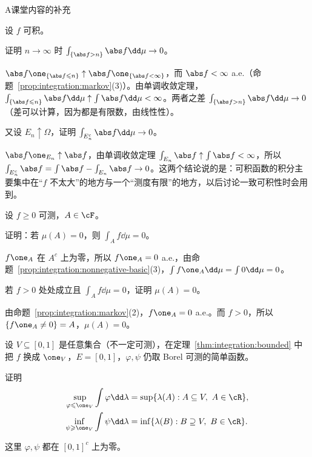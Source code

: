 \begin{exercises}{A}{课堂内容的补充}
\item\label{ex:integration:A6} 设 $f$ 可积。
\begin{questions}
\item 证明 $n\to\infty$ 时 $\int_{\{\abs f>n\}}\abs f\dd\mu\to0$。
\begin{solution}
$\abs f\one_{\{\abs f\leqslant n\}}\uparrow\abs f\one_{\{\abs f<\infty\}}$，而 $\abs f<\infty$ a.e.（命题~\ref{prop:integration:markov}(3)）。由单调收敛定理，$\int_{\{\abs f\leqslant n\}}\abs f\dd\mu\uparrow\int\abs f\dd\mu<\infty$。两者之差 $\int_{\{\abs f>n\}}\abs f\dd\mu\to0$（差可以计算，因为都是有限数，由线性性）。
\end{solution}
\item 又设 $E_n\uparrow\Omega$，证明 $\int_{E_n^c}\abs f\dd\mu\to0$。
\begin{solution}
$\abs f\one_{E_n}\uparrow\abs f$，由单调收敛定理 $\int_{E_n}\abs f\uparrow\int\abs f<\infty$，所以 $\int_{E_n^c}\abs f=\int\abs f-\int_{E_n}\abs f\to0$。这两个结论说的是：可积函数的积分主要集中在“$f$ 不太大”的地方与一个“测度有限”的地方，以后讨论一致可积性时会用到。
\end{solution}
\end{questions}

\item\label{ex:integration:A7} 设 $f\geqslant0$ 可测，$A\in\cF$。
\begin{questions}
\item 证明：若 $\mu(A)=0$，则 $\int_Af\dd\mu=0$。
\begin{solution}
$f\one_A$ 在 $A^c$ 上为零，所以 $f\one_A=0$ a.e.，由命题~\ref{prop:integration:nonnegative-basic}(3)，$\int f\one_A\dd\mu=\int0\dd\mu=0$。
\end{solution}
\item 若 $f>0$ 处处成立且 $\int_Af\dd\mu=0$，证明 $\mu(A)=0$。
\begin{solution}
由命题~\ref{prop:integration:markov}(2)，$f\one_A=0$ a.e.。而 $f>0$，所以 $\{f\one_A\neq0\}=A$，$\mu(A)=0$。
\end{solution}
\end{questions}

\item\label{ex:integration:A8} 设 $V\subseteq[0,1]$ 是任意集合（不一定可测），在定理~\ref{thm:integration:bounded} 中把 $f$ 换成 $\one_V$，$E=[0,1]$，$\varphi,\psi$ 仍取 Borel 可测的简单函数。
\begin{questions}
\item 证明
\[
\begin{aligned}
\sup_{\varphi\leqslant\one_V}\int\varphi\dd\lambda&=\sup\{\lambda(A):A\subseteq V,\ A\in\cR\},\\
\inf_{\psi\geqslant\one_V}\int\psi\dd\lambda&=\inf\{\lambda(B):B\supseteq V,\ B\in\cR\}.
\end{aligned}
\]
\begin{solution}
这里 $\varphi,\psi$ 都在 $[0,1]^c$ 上为零。


\end{solution}
\end{questions}
\end{exercises}
